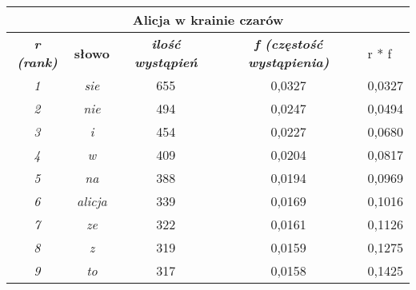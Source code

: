 \documentclass[a4paper]{article}
\begin{document}
\begin{table}
\begin{tabular}{ccc|c|l|}
\hline
\multicolumn{5}{|c|}{\textbf{Alicja w krainie czarów}}                                                                                                                            \\ \hline
\multicolumn{1}{|c|}{\textit{\textbf{r (rank)}}} & \multicolumn{1}{c|}{\textbf{słowo}}  & \textit{\textbf{ilość wystąpień}} & \textit{\textbf{f (częstość wystąpienia)}} & r * f  \\ \hline
\multicolumn{1}{|c|}{\textit{1}}                 & \multicolumn{1}{c|}{\textit{sie}}    & 655                               & 0,0327                                     & 0,0327 \\ \hline
\multicolumn{1}{|c|}{\textit{2}}                 & \multicolumn{1}{c|}{\textit{nie}}    & 494                               & 0,0247                                     & 0,0494 \\ \hline
\multicolumn{1}{|c|}{\textit{3}}                 & \multicolumn{1}{c|}{\textit{i}}      & 454                               & 0,0227                                     & 0,0680 \\ \hline
\multicolumn{1}{|c|}{\textit{4}}                 & \multicolumn{1}{c|}{\textit{w}}      & 409                               & 0,0204                                     & 0,0817 \\ \hline
\multicolumn{1}{|c|}{\textit{5}}                 & \multicolumn{1}{c|}{\textit{na}}     & 388                               & 0,0194                                     & 0,0969 \\ \hline
\multicolumn{1}{|c|}{\textit{6}}                 & \multicolumn{1}{c|}{\textit{alicja}} & 339                               & 0,0169                                     & 0,1016 \\ \hline
\multicolumn{1}{|c|}{\textit{7}}                 & \multicolumn{1}{c|}{\textit{ze}}     & 322                               & 0,0161                                     & 0,1126 \\ \hline
\multicolumn{1}{|c|}{\textit{8}}                 & \multicolumn{1}{c|}{\textit{z}}      & 319                               & 0,0159                                     & 0,1275 \\ \hline
\multicolumn{1}{|c|}{\textit{9}}                 & \multicolumn{1}{c|}{\textit{to}}     & 317                               & 0,0158                                     & 0,1425 \\ \hline

\end{tabular}
\end{table}
\end{document}
